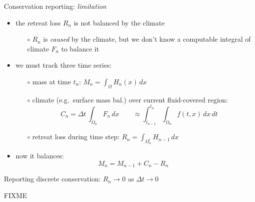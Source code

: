 \documentclass{beamer}
\begin{document}
\begin{frame}{Conservation reporting: \emph{limitation}}

\begin{itemize}
\item \alert{the retreat loss $R_n$ is not balanced by the climate}
  \begin{itemize}
  \item[$\circ$] $R_n$ is \emph{caused} by the climate, but we don't know a computable integral of climate $F_n$ to balance it
  \end{itemize}
\item we must track \alert{three} time series:
  \begin{itemize}
  \item[$\circ$] mass at time $t_n$: \qquad $M_n = \int_\Omega H_n(x)\,dx$

  \smallskip
  \item[$\circ$] climate (e.g.~surface mass bal.) over current fluid-covered region:
     $$C_n = \Delta t\, \int_{\Omega_n} F_n \,dx \qquad \approx \int_{t_{n-1}}^{t_n} \int_{\Omega_n} f(t,x) \,dx\,dt$$
  \item[$\circ$] retreat loss during time step: \qquad $R_n = \int_{\Omega_n^r} H_{n-1} \,dx$
  \end{itemize}
\item now it balances:
     $$M_n = M_{n-1} + C_n - R_n$$
\end{itemize}
\end{frame}


\begin{frame}{Reporting discrete conservation: $R_n\to 0$ as $\Delta t\to 0$}

\begin{center}

FIXME
\end{center}
\end{frame}
\end{document}
